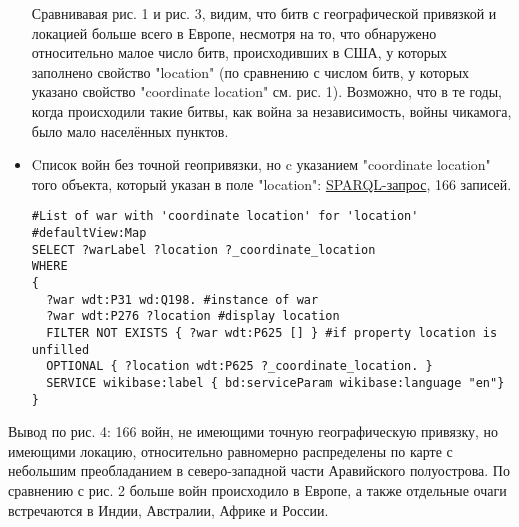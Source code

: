\begin{itemize}
Сравнивавая рис. 1 и рис. 3, видим, что битв с географической привязкой и локацией больше всего в Европе, несмотря на то, что обнаружено относительно малое число битв, происходивших в США, у которых заполнено свойство "location" (по сравнению с числом битв, у которых указано свойство "coordinate location" см. рис. 1). Возможно, что в те годы, когда происходили такие битвы, как война за независимость, войны чикамога, было мало населённых пунктов.

\item{Cписок войн без точной геопривязки, но c указанием "coordinate location" того объекта, который указан в поле "location":} \href{https://query.wikidata.org/#%23List%20of%20war%20with%20unfilled%20property%20%27location%27%20%0A%23defaultView%3AMap%0ASELECT%20%3FwarLabel%20%3Flocation%20%3F_coordinate_location%0AWHERE%0A%7B%0A%20%20%3Fwar%20wdt%3AP31%20wd%3AQ198.%20%23instance%20of%20war%0A%20%20%3Fwar%20wdt%3AP276%20%3Flocation%20%23display%20location%0A%20%20FILTER%20NOT%20EXISTS%20%7B%20%3Fwar%20wdt%3AP625%20%5B%5D%20%7D%20%23if%20property%20location%20is%20unfilled%0A%20%20OPTIONAL%20%7B%20%3Flocation%20wdt%3AP625%20%3F_coordinate_location.%20%7D%0A%20%20SERVICE%20wikibase%3Alabel%20%7B%20bd%3AserviceParam%20wikibase%3Alanguage%20%22en%22%7D%0A%7D}{ SPARQL-запрос}, 166 записей.
\begin{lstlisting}[language=SPARQL]
#List of war with 'coordinate location' for 'location'
#defaultView:Map
SELECT ?warLabel ?location ?_coordinate_location
WHERE
{
  ?war wdt:P31 wd:Q198. #instance of war
  ?war wdt:P276 ?location #display location
  FILTER NOT EXISTS { ?war wdt:P625 [] } #if property location is unfilled
  OPTIONAL { ?location wdt:P625 ?_coordinate_location. }
  SERVICE wikibase:label { bd:serviceParam wikibase:language "en"}
}
\end{lstlisting}
\end{itemize}

Вывод по рис. 4: 166 войн, не имеющими точную географическую привязку, но имеющими локацию, относительно равномерно распределены по карте с небольшим преобладанием в северо-западной части Аравийского полуострова. По сравнению с рис. 2 больше войн происходило в Европе, а также отдельные очаги встречаются в Индии, Австралии, Африке и России.

